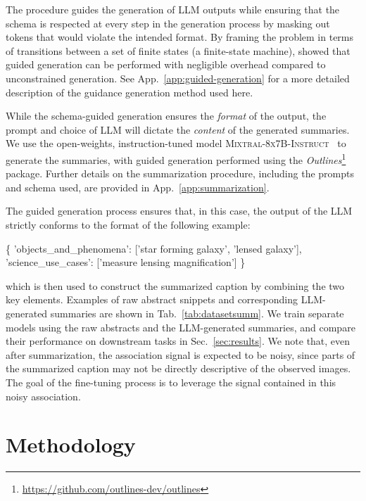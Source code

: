 \documentclass[10pt]{article} %
\newcommand{\package}[1]{\textsl{#1}\xspace}
\begin{document}
The procedure guides the generation of LLM outputs while ensuring that the schema is respected at every step in the generation process by masking out tokens that would violate the intended format.
%
By framing the problem in terms of transitions between a set of finite states (a finite-state machine), \cite{willard2023efficient} showed that guided generation can be performed with negligible overhead compared to unconstrained generation.
%
See App.~\ref{app:guided-generation} for a more detailed description of the guidance generation method used here.

While the schema-guided generation ensures the \emph{format} of the output, the prompt and choice of LLM will dictate the \emph{content} of the generated summaries.
%
We use the open-weights, instruction-tuned model \textsc{Mixtral-8x7B-Instruct}~\citep{jiang2024mixtral} to generate the summaries, with guided generation performed using the \package{Outlines}\footnote{\url{https://github.com/outlines-dev/outlines}} package.
%
Further details on the summarization procedure, including the prompts and schema used, are provided in App.~\ref{app:summarization}.


The guided generation process ensures that, in this case, the output of the LLM strictly conforms to the format of the following example:
\begin{center}
  \begin{jsoncode}
    \centering
          \color{black}\{
            \color{codegreen}'objects_and_phenomena'\color{black}: [\color{codegreen}'star forming galaxy', 'lensed galaxy'\color{black}], 
            \color{codegreen}'science_use_cases'\color{black}: [\color{codegreen}'measure lensing magnification'\color{black}]
          \color{black}\}
  \end{jsoncode}
  \end{center}
which is then used to construct the summarized caption by combining the two key elements.
%
Examples of raw abstract snippets and corresponding LLM-generated summaries are shown in Tab.~\ref{tab:datasetsumm}.
%
We train separate models using the raw abstracts and the LLM-generated summaries, and compare their performance on downstream tasks in Sec.~\ref{sec:results}.
%
We note that, even after summarization, the association signal is expected to be noisy, since parts of the summarized caption may not be directly descriptive of the observed images. The goal of the fine-tuning process is to leverage the signal contained in this noisy association.

\section{Methodology}
\label{sec:methodology}
\end{document}
